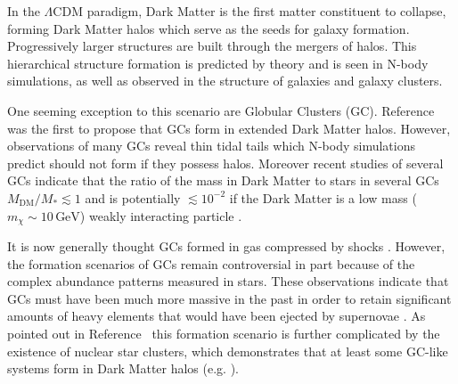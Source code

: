 \documentclass[aps,floatfix,prd,showpacs]{revtex4}
\newcommand{\mx}{m_\chi}
\newcommand{\MDM}{M_{\mathrm{DM}}}
\newcommand{\gev}{\textrm{GeV}}
\begin{document}
In the $\Lambda$CDM paradigm, Dark Matter is the first matter constituent to collapse, forming Dark Matter halos which serve as the seeds for galaxy formation. Progressively larger structures are built through the mergers of halos. This hierarchical structure formation is predicted by theory and is seen in N-body simulations, as well as observed in the structure of galaxies and galaxy clusters. 


One seeming exception to this scenario are Globular Clusters (GC). Reference~\cite{Peebles1984} was the first to propose that GCs form in extended Dark Matter halos. However, observations of many GCs reveal thin tidal tails which N-body simulations predict should not form if they possess halos. Moreover recent studies of several GCs indicate that the ratio of the mass in Dark Matter to stars in several GCs $\MDM/M_* \lesssim 1$ \cite{Grillmair1995,Odenkirchen2003,Moore1996,Shin, Conroy,Ibata2013} and is potentially $\lesssim 10^{-2}$ if the Dark Matter is a low mass ($\mx \sim 10\, \gev$) weakly interacting particle \cite{HurstWDGC}. 



It is now generally thought GCs formed in gas compressed by shocks \cite{Gunn1980,Harris1994}. However, the formation scenarios of GCs remain controversial in part because of the complex abundance patterns measured in stars. These observations indicate that GCs must have been much more massive in the past in order to retain significant amounts of heavy elements that would have been ejected by supernovae \cite{Gratton,Gratton2012,Con&Sperg}. As pointed out in Reference~\cite{Conroy} this formation scenario is further complicated by the existence of nuclear star clusters, which demonstrates that at least some GC-like systems form in Dark Matter halos (e.g. \cite{Taylor2015,Boker2004,Walcher2005,Walcher2006}).
\end{document}
